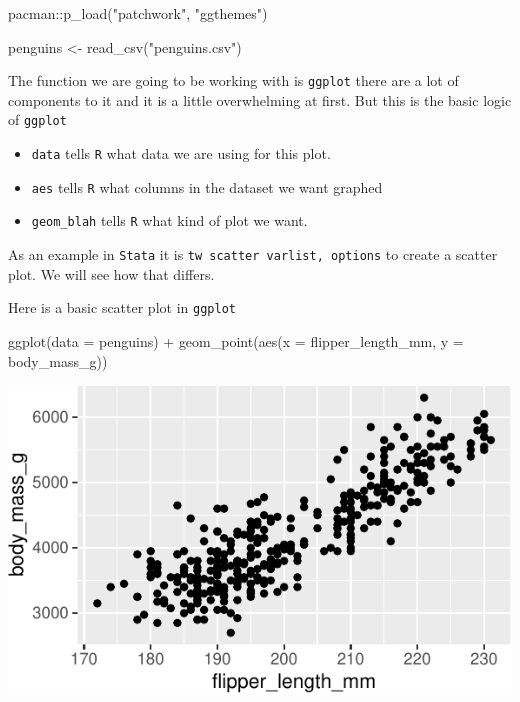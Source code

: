 \documentclass[]{tufte-handout}
\newenvironment{Shaded}{}{}
\newcommand{\AttributeTok}[1]{\textcolor[rgb]{0.49,0.56,0.16}{#1}}
\newcommand{\FunctionTok}[1]{\textcolor[rgb]{0.02,0.16,0.49}{#1}}
\newcommand{\NormalTok}[1]{#1}
\newcommand{\OtherTok}[1]{\textcolor[rgb]{0.00,0.44,0.13}{#1}}
\newcommand{\SpecialCharTok}[1]{\textcolor[rgb]{0.25,0.44,0.63}{#1}}
\newcommand{\StringTok}[1]{\textcolor[rgb]{0.25,0.44,0.63}{#1}}
\providecommand{\tightlist}{%
  \setlength{\itemsep}{0pt}\setlength{\parskip}{0pt}}
\begin{document}
\begin{Shaded}
\begin{Highlighting}[]
\NormalTok{pacman}\SpecialCharTok{::}\FunctionTok{p\_load}\NormalTok{(}\StringTok{"patchwork"}\NormalTok{, }\StringTok{"ggthemes"}\NormalTok{)}


\NormalTok{penguins }\OtherTok{\textless{}{-}} \FunctionTok{read\_csv}\NormalTok{(}\StringTok{"penguins.csv"}\NormalTok{)}
\end{Highlighting}
\end{Shaded}

The function we are going to be working with is \texttt{ggplot} there
are a lot of components to it and it is a little overwhelming at first.
But this is the basic logic of \texttt{ggplot}

\begin{itemize}
\tightlist
\item
  \texttt{data} tells \texttt{R} what data we are using for this plot.
\item
  \texttt{aes} tells \texttt{R} what columns in the dataset we want
  graphed
\item
  \texttt{geom\_blah} tells \texttt{R} what kind of plot we want.
\end{itemize}

As an example in \texttt{Stata} it is
\texttt{tw\ scatter\ varlist,\ options} to create a scatter plot. We
will see how that differs.

Here is a basic scatter plot in \texttt{ggplot}

\begin{Shaded}
\begin{Highlighting}[]
\FunctionTok{ggplot}\NormalTok{(}\AttributeTok{data =}\NormalTok{ penguins) }\SpecialCharTok{+}
  \FunctionTok{geom\_point}\NormalTok{(}\FunctionTok{aes}\NormalTok{(}\AttributeTok{x =}\NormalTok{ flipper\_length\_mm, }\AttributeTok{y =}\NormalTok{ body\_mass\_g))}
\end{Highlighting}
\end{Shaded}

\begin{center}\includegraphics{R-Guide_files/figure-latex/scatter-basic-1} \end{center}
\end{document}
